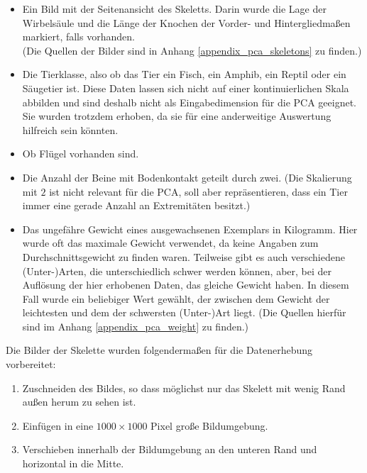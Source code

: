 \begin{itemize}
  \item Ein Bild mit der Seitenansicht des Skeletts.
  Darin wurde die Lage der Wirbelsäule und die Länge der Knochen der Vorder- und Hintergliedmaßen markiert, falls vorhanden.\\
  (Die Quellen der Bilder sind in Anhang \ref{appendix_pca_skeletons} zu finden.)
  
  \item Die Tierklasse, also ob das Tier ein Fisch, ein Amphib, ein Reptil oder ein Säugetier ist. Diese Daten lassen sich nicht auf einer kontinuierlichen Skala abbilden und sind deshalb nicht als Eingabedimension für die PCA geeignet. Sie wurden trotzdem erhoben, da sie für eine anderweitige Auswertung hilfreich sein könnten.
  
  \item Ob Flügel vorhanden sind.
  
  \item Die Anzahl der Beine mit Bodenkontakt geteilt durch zwei. (Die Skalierung mit $2$ ist nicht relevant für die PCA, soll aber repräsentieren, dass ein Tier immer eine gerade Anzahl an Extremitäten besitzt.)
  
  \item Das ungefähre Gewicht eines ausgewachsenen Exemplars in Kilogramm. Hier wurde oft das maximale Gewicht verwendet, da keine Angaben zum Durchschnittsgewicht zu finden waren. Teilweise gibt es auch verschiedene (Unter-)Arten, die unterschiedlich schwer werden können, aber, bei der Auflösung der hier erhobenen Daten, das gleiche Gewicht haben. In diesem Fall wurde ein beliebiger Wert gewählt, der zwischen dem Gewicht der leichtesten und dem der schwersten (Unter-)Art liegt. (Die Quellen hierfür sind im Anhang \ref{appendix_pca_weight} zu finden.)
 \end{itemize}

 Die Bilder der Skelette wurden folgendermaßen für die Datenerhebung vorbereitet:
 
 \begin{enumerate}
  \item Zuschneiden des Bildes, so dass möglichst nur das Skelett mit wenig Rand außen herum zu sehen ist.
  \item Einfügen in eine $1000 \times 1000$ Pixel große Bildumgebung.
  \item Verschieben innerhalb der Bildumgebung an den unteren Rand und horizontal in die Mitte.
 \end{enumerate}

